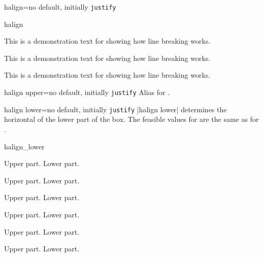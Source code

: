 \begin{docTcbKey}[][doc new=2015-05-07]{halign}{=}{no default, initially \texttt{justify}}
\begin{exdispExample}{halign}
\begin{tcolorbox}[adjusted title=center,halign=center]
This is a demonstration text for showing how line breaking works.
\end{tcolorbox}
\begin{tcolorbox}[adjusted title=left,halign=left]
This is a demonstration text for showing how line breaking works.
\end{tcolorbox}
\begin{tcolorbox}[adjusted title=right,halign upper=right]
This is a demonstration text for showing how line breaking works.
\end{tcolorbox}
\end{exdispExample}

\end{docTcbKey}


\begin{docTcbKey}[][doc new=2015-05-07]{halign upper}{=}{no default, initially \texttt{justify}}
  Alias for .
\end{docTcbKey}

\newpage
\begin{docTcbKey}[][doc new=2015-05-07]{halign lower}{=}{no default, initially \texttt{justify}}
  |halign lower| determines the horizontal  of the lower part of the box.
  The feasible values for  are the same as for .

\begin{exdispExample}{halign_lower}
\begin{tcbraster}[raster columns=3,fonttitle=\bfseries,
  colback=red!5!white,colframe=red!75!black]

  \begin{tcolorbox}[adjusted title=flush center,halign lower=flush center]
    Upper part. \tcblower Lower part.
  \end{tcolorbox}
  \begin{tcolorbox}[adjusted title=flush left,halign lower=flush left]
    Upper part. \tcblower Lower part.
  \end{tcolorbox}
  \begin{tcolorbox}[adjusted title=flush right,halign lower=flush right]
    Upper part. \tcblower Lower part.
  \end{tcolorbox}
  \begin{tcolorbox}[adjusted title=center,halign lower=center]
    Upper part. \tcblower Lower part.
  \end{tcolorbox}
  \begin{tcolorbox}[adjusted title=left,halign lower=left]
    Upper part. \tcblower Lower part.
  \end{tcolorbox}
  \begin{tcolorbox}[adjusted title=right,halign lower=right]
    Upper part. \tcblower Lower part.
  \end{tcolorbox}

\end{tcbraster}
\end{exdispExample}
\end{docTcbKey}


